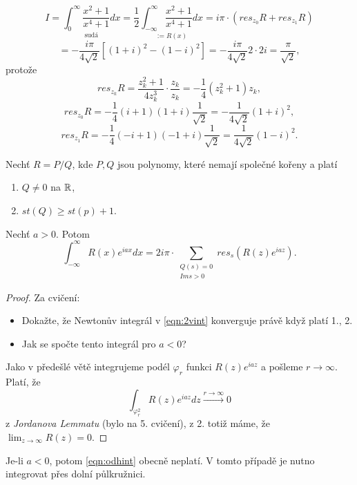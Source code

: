 \begin{example}
$$I=\underset{\text{sudá}}{\int_0^\infty{\frac{x^2+1}{x^4+1}}dx}
=\frac{1}{2}\underset{:=R(x)}{\int_{-\infty}^\infty\frac{x^2+1}
{x^4+1}dx}=i\pi\cdot(res_{z_0}R+res_{z_1}R)$$
$$=-\frac{i\pi}{4\sqrt{2}}\left[(1+i)^2-(1-i)^2\right]=-\frac{i\pi}{4\sqrt{2}}2\cdot 2i=\frac{\pi}{\sqrt{2}},$$ protože
$${res}_{z_k}R=\frac{z_k^2+1}{4z^3_k}\cdot\frac{z_k}{z_k}=
-\frac{1}{4}(z_k^2+1)z_k,$$
$${res}_{z_0}R=-\frac{1}{4}(i+1)(1+i)\frac{1}{\sqrt{2}}=-\frac{1}{4\sqrt{2}}(1+i)^2,$$
$${res}_{z_1}R=-\frac{1}{4}(-i+1)(-1+i)\frac{1}{\sqrt{2}}=\frac{1}{4\sqrt{2}}(1-i)^2.$$
\end{example}

\begin{theorem}
Nechť $R=P/Q$, kde $P,Q$ jsou polynomy, které nemají společné kořeny a platí
\begin{enumerate}
    \item $Q\neq 0$ na $\operatorname{\mathbb{R}} $,
    \item $st(Q)\geq st(p)+1$.
\end{enumerate}
Nechť $a>0$. Potom
\begin{equation}
    \label{eqn:2vint}
    \int_{-\infty}^\infty{R(x)e^{iax}}dx = 2i\pi\cdot\sum_{\begin{array}{cc}
         Q(s)=0  \\
         {Im}{s}>0 
    \end{array}}{res_s\left({R(z)e^{iaz}}\right)}.
\end{equation}
\end{theorem}
\begin{proof}
Za cvičení:
\begin{itemize}
    \item Dokažte, že Newtonův integrál v \cref{eqn:2vint} konverguje právě když platí 1., 2.
    \item Jak se spočte tento integrál pro $a<0$?
\end{itemize}
Jako v předešlé větě integrujeme podél $\varphi_r$ funkci $R(z)e^{iaz}$ a pošleme $r\to\infty$. Platí, že
\begin{equation}
    \int_{\varphi_r^2}{R(z)e^{iaz}}dz\overset{r\to\infty}{\longrightarrow}0
    \label{eqn:odhint}
\end{equation}
z \textit{Jordanova Lemmatu} (bylo na 5. cvičení), z 2. totiž máme, že $\lim_{z\to\infty}R(z)=0$.
\end{proof}

\begin{note}
Je-li $a<0$, potom \cref{eqn:odhint} obecně neplatí. V tomto případě je nutno integrovat přes dolní půlkružnici.
\end{note}

